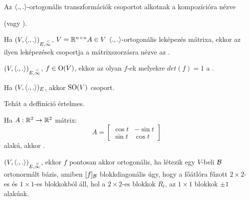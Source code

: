 \begin{all}
	Az $\langle.,.\rangle$-ortogonális transzformációk csoportot alkotnak a kompozícióra nézve
\end{all}

\begin{jel}
	 (vagy \vjel{$\vO_{\scp{}}$}).
\end{jel}

\begin{ff}
	Ha $(V,\langle.,.\rangle)_{E,\overset{<}{\infty}}$, $V=\mathbb{R}^{n\times n} A\in V$ $\langle.,.\rangle$-ortogonális leképezés mátrixa, ekkor az
	ilyen leképezések csoportja a mátrixszorzásra nézve az .
\end{ff}

\begin{jel}
\end{jel}

\begin{ff}
	$(V,\langle.,.\rangle)_{E,\overset{<}{\infty}}$, $f\in\operatorname{O}(V)$, ekkor az olyan $f$-ek melyekre $det(f)=1$ a
	.
\end{ff}

\begin{jel}
\end{jel}

\begin{all}
	Ha $(V,\langle.,.\rangle)_E$, akkor $\operatorname{SO}(V)$ csoport.
\end{all}

\begin{megj}
	Tehát a deffiníció értelmes.
\end{megj}

\begin{ff}
	Ha $A:\mathbb{R}^2\to \mathbb{R}^2$ mátrix:
	\begin{equation*}
		A=	
		\begin{bmatrix}
			\cos t & -\sin t\\
			\sin t & \cos t
		\end{bmatrix}
	\end{equation*}
	alakú, akkor .
\end{ff}

\begin{jel}
\end{jel}

\begin{tet}
	$(V,\langle.,.\rangle)_{E,\overset{<}{\infty}}$, ekkor $f$ pontosan akkor ortogonális, ha létezik egy
	$V$-beli $\mathcal{B}$ ortonormált bázis, amiben $[f]_{\mathcal{B}}$ blokkdiagonális úgy, hogy
	a főátlóra fűzott $2\times 2$-es és $1\times 1$-es blokkokból áll, hol a
	$2\times 2$-es blokkok $R_t$, az $1\times 1$
	blokkok $\pm1$ alakúak.
\end{tet}

